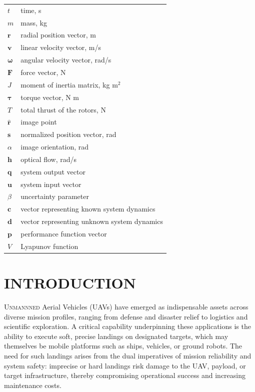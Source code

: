 \documentclass{IEEEtaes}
\begin{document}
\begin{tabular}{@{}l @{\quad=\quad} l@{}}
$t$ & time, s \\
$m$ & mass, kg \\
$\boldsymbol{r}$ & radial position vector, m \\
$\boldsymbol{v}$ & linear velocity vector, m/s \\
$\boldsymbol{\omega}$ & angular velocity vector, rad/s \\
$\boldsymbol{F}$ & force vector, N \\
$J$ & moment of inertia matrix, kg m$^2$ \\
$\boldsymbol{\tau}$ & torque vector, N m \\
$T$ & total thrust of the rotors, N \\
$\hat{\boldsymbol{r}}$ & image point \\
$\boldsymbol{s}$ & normalized position vector, rad \\
$\alpha$ & image orientation, rad \\
$\boldsymbol{h}$ & optical flow, rad/s \\
$\boldsymbol{q}$ & system output vector \\
$\boldsymbol{u}$ & system input vector \\
$\beta$ & uncertainty parameter \\
$\boldsymbol{c}$ & vector representing known system dynamics \\
$\boldsymbol{d}$ & vector representing unknown system dynamics \\
$\boldsymbol{p}$ & performance function vector \\
$V$ & Lyapunov function
\end{tabular}

\section{INTRODUCTION}
U{\scshape nmannned} Aerial Vehicles (UAVs) have emerged as indispensable assets across diverse mission profiles, ranging from defense and disaster relief to logistics and scientific exploration. A critical capability underpinning these applications is the ability to execute soft, precise landings on designated targets, which may themselves be mobile platforms such as ships, vehicles, or ground robots. The need for such landings arises from the dual imperatives of mission reliability and system safety: imprecise or hard landings risk damage to the UAV, payload, or target infrastructure, thereby compromising operational success and increasing maintenance costs.
\end{document}
